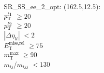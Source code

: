 SR\_SS\_ee\_2\_opt: (162.5,12.5): \\
$p_{\text{T}}^{l1}$ $\geq 20$ \\
$p_{\text{T}}^{l2}$ $\geq 20$ \\
$|\Delta\eta_{ll}|$ $<2$ \\
$E_{\text{T}}^{\text{miss,rel}}$ $\geq 75$ \\
$m_{\text{T}}^{\text{max}}$ $\geq 90$ \\
$m_{lj}$/$m_{ljj}$ $<130$ \\

